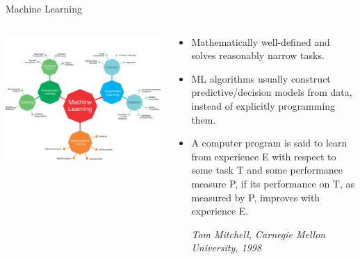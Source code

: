 \documentclass[11pt,compress,t,notes=noshow, xcolor=table]{beamer}
\begin{document}
\begin{frame}{Machine Learning}

\begin{columns}
\begin{column}{0.65\textwidth}
\begin{center}
  \includegraphics[trim=0 0 0 0,clip,width=\textwidth]{figure_man/whatisml.png}
\end{center}
\end{column}
\begin{column}{0.45\textwidth}
\begin{footnotesize}
\begin{itemize}
	\item Mathematically well-defined and solves reasonably narrow tasks.
	\item ML algorithms usually construct predictive/decision models from data, instead of explicitly programming them.
    \item A computer program is said to learn from experience E with respect to
  some task T and some performance measure P, if its performance on T, as 
  measured by P, improves with experience E. \\
  \begin{footnotesize}
  \emph{Tom Mitchell, Carnegie Mellon University, 1998}
  \end{footnotesize}
\end{itemize}
\end{footnotesize}
\end{column}
\end{columns}
  
\end{frame}
\end{document}
